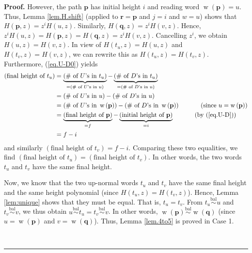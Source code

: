 \documentclass[numbers=enddot,12pt,final,onecolumn,notitlepage]{scrartcl}%
\theoremstyle{definition}
\newenvironment{proof}[1][Proof]{\noindent\textbf{#1.} }{\ \rule{0.5em}{0.5em}}
\newcommand{\pp}{\mathbf{p}}
\newcommand{\qq}{\mathbf{q}}
\newcommand{\rr}{\mathbf{r}}
\newcommand{\w}{\operatorname{w}}
\newcommand{\balsim}{\overset{\operatorname*{bal}}{\sim}}
\newenvironment{verlong}{}{}
\begin{document}
\begin{verlong}
\begin{proof}
However, the path $\pp$ has initial height $i$ and reading word
$\w\left(  \pp\right)  =u$. Thus, Lemma
\ref{lem.H.shift} (applied to $\rr=\pp$ and $j=i$ and $w=u$)
shows that $H\left(  \pp,z\right)  =z^{i}H\left(  u,z\right)  $.
Similarly, $H\left(  \qq,z\right)  =z^{i}H\left(  v,z\right)  $. Hence,
$z^{i}H\left(  u,z\right)  =H\left(  \pp,z\right)  =H\left(
\qq,z\right)  =z^{i}H\left(  v,z\right)  $. Cancelling $z^{i}$, we
obtain $H\left(  u,z\right)  =H\left(  v,z\right)  $. In view of $H\left(
t_{u},z\right)  =H\left(  u,z\right)  $ and $H\left(  t_{v},z\right)
=H\left(  v,z\right)  $, we can rewrite this as $H\left(  t_{u},z\right)
=H\left(  t_{v},z\right)  $. Furthermore, (\ref{eq.U-D0}) yields
\begin{align*}
\left(  \text{final height of }t_{u}\right)    & =\underbrace{\left(  \text{\#
of }U\text{'s in }t_{u}\right)  }_{=\left(  \text{\# of }U\text{'s in
}u\right)  }-\underbrace{\left(  \text{\# of }D\text{'s in }t_{u}\right)
}_{=\left(  \text{\# of }D\text{'s in }u\right)  }\\
& =\left(  \text{\# of }U\text{'s in }u\right)  -\left(  \text{\# of
}D\text{'s in }u\right)  \\
& =\left(  \text{\# of }U\text{'s in }\w\left(  \pp%
\right)  \right)  -\left(  \text{\# of }D\text{'s in }\w\left(
\pp\right)  \right)  \ \ \ \ \ \ \ \ \ \ \left(  \text{since
}u=\w\left(  \pp\right)  \right)  \\
& =\underbrace{\left(  \text{final height of }\pp\right)  }%
_{=f}-\underbrace{\left(  \text{initial height of }\pp\right)  }%
_{=i}\ \ \ \ \ \ \ \ \ \ \left(  \text{by (\ref{eq.U-D})}\right)  \\
& =f-i
\end{align*}
and similarly $\left(  \text{final height of }t_{v}\right)  =f-i$. Comparing
these two equalities, we find $\left(  \text{final height of }t_{u}\right)
=\left(  \text{final height of }t_{v}\right)  $. In other words, the two words
$t_{u}$ and $t_{v}$ have the same final height.

Now, we know that the two up-normal words $t_{u}$ and $t_{v}$ have the same
final height and the same height polynomial (since $H\left(  t_{u},z\right)
=H\left(  t_{v},z\right)  $). Hence, Lemma \ref{lem:unique} shows that they
must be equal. That is, $t_{u}=t_{v}$.
From $t_{u} \balsim u$ and $t_{v} \balsim v$, we thus obtain
$u \balsim t_{u} = t_{v} \balsim v$.
In other words, $\w\left(  \pp\right)
\balsim \w\left(  \qq\right)
$ (since $u=\w\left(  \pp\right)  $ and
$v=\w\left(  \qq\right)  $). Thus, Lemma \ref{lem.4to5}
is proved in Case 1.


\end{proof}
\end{verlong}
\end{document}
